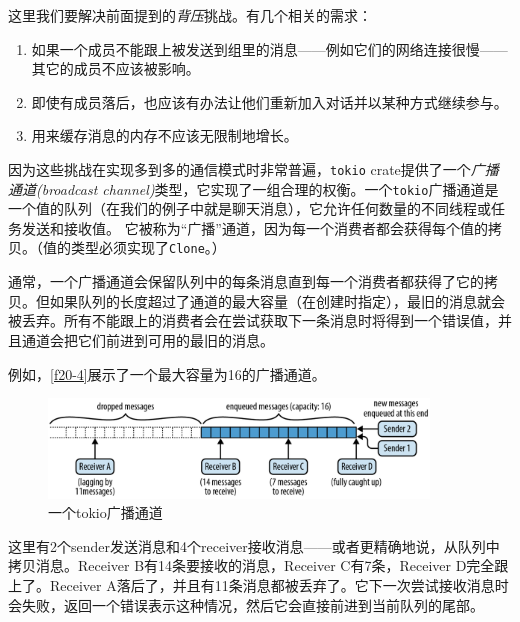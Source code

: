 这里我们要解决前面提到的\emph{背压}挑战。有几个相关的需求：
\begin{enumerate}
    \item 如果一个成员不能跟上被发送到组里的消息——例如它们的网络连接很慢——其它的成员不应该被影响。
    \item 即使有成员落后，也应该有办法让他们重新加入对话并以某种方式继续参与。
    \item 用来缓存消息的内存不应该无限制地增长。
\end{enumerate}

因为这些挑战在实现多到多的通信模式时非常普遍，\texttt{tokio} crate提供了一个\emph{广播通道(broadcast channel)}类型，它实现了一组合理的权衡。一个\texttt{tokio}广播通道是一个值的队列（在我们的例子中就是聊天消息），它允许任何数量的不同线程或任务发送和接收值。 它被称为“广播”通道，因为每一个消费者都会获得每个值的拷贝。（值的类型必须实现了\texttt{Clone}。）

通常，一个广播通道会保留队列中的每条消息直到每一个消费者都获得了它的拷贝。但如果队列的长度超过了通道的最大容量（在创建时指定），最旧的消息就会被丢弃。所有不能跟上的消费者会在尝试获取下一条消息时将得到一个错误值，并且通道会把它们前进到可用的最旧的消息。

例如，\autoref{f20-4}展示了一个最大容量为16的广播通道。
\begin{figure}[htbp]
    \centering
    \includegraphics[width=0.9\textwidth]{../img/f20-4.png}
    \caption{一个tokio广播通道}
    \label{f20-4}
\end{figure}

这里有2个sender发送消息和4个receiver接收消息——或者更精确地说，从队列中拷贝消息。Receiver B有14条要接收的消息，Receiver C有7条，Receiver D完全跟上了。Receiver A落后了，并且有11条消息都被丢弃了。它下一次尝试接收消息时会失败，返回一个错误表示这种情况，然后它会直接前进到当前队列的尾部。

